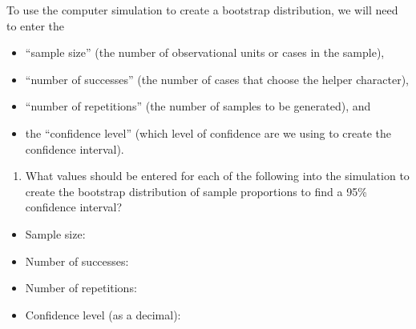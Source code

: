 \documentclass[
]{report}
\providecommand{\tightlist}{%
  \setlength{\itemsep}{0pt}\setlength{\parskip}{0pt}}
\begin{document}
\vspace{0.5in}

To use the computer simulation to create a bootstrap distribution, we will need to enter the

\begin{itemize}
\tightlist
\item
  ``sample size'' (the number of observational units or cases in the sample),
\item
  ``number of successes'' (the number of cases that choose the helper character),
\item
  ``number of repetitions'' (the number of samples to be generated), and
\item
  the ``confidence level'' (which level of confidence are we using to create the confidence interval).
\end{itemize}

\begin{enumerate}
\def\labelenumi{\arabic{enumi}.}
\setcounter{enumi}{4}
\tightlist
\item
  What values should be entered for each of the following into the simulation to create the bootstrap distribution of sample proportions to find a 95\% confidence interval?
  \vspace{1mm}
\end{enumerate}

\begin{itemize}
\tightlist
\item
  Sample size:
\end{itemize}

\vspace{.1in}

\begin{itemize}
\tightlist
\item
  Number of successes:
\end{itemize}

\vspace{.1in}

\begin{itemize}
\tightlist
\item
  Number of repetitions:
\end{itemize}

\vspace{.1in}

\begin{itemize}
\tightlist
\item
  Confidence level (as a decimal):
\end{itemize}
\end{document}
